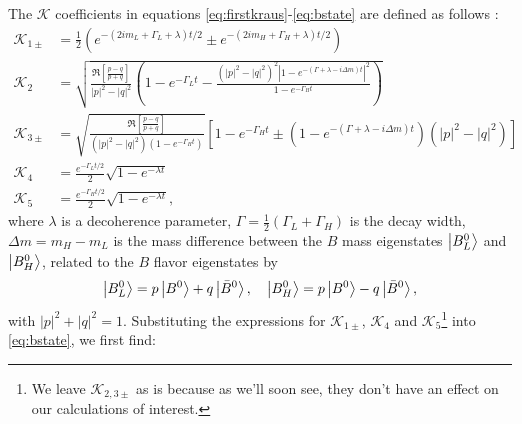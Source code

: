 The $\mathcal{K}$ coefficients in equations \ref{eq:firstkraus}-\ref{eq:bstate} are defined as follows \cite{Naikoo}:
\begin{align}
\mathcal{K}_{1\pm} &= \frac{1}{2}\left(e^{-(2im_L+\Gamma_L+\lambda)t/2}\pm e^{-(2im_H+\Gamma_H+\lambda)t/2}\right) \nonumber \\
\mathcal{K}_2 &= \sqrt{\frac{\Re\left[\frac{p-q}{p+q}\right]}{|p|^2-|q|^2}\left(1-e^{-\Gamma_L t}-\frac{(|p|^2-|q|^2)^2 |1-e^{-(\Gamma+\lambda-i\Delta m)t}|^2}{1-e^{-\Gamma_H t}}\right)} \nonumber \\
\mathcal{K}_{3\pm} &= \sqrt{\frac{\Re\left[\frac{p-q}{p+q}\right]}{(|p|^2-|q|^2)(1-e^{-\Gamma_H t})}}\left[1-e^{-\Gamma_H t}\pm(1-e^{-(\Gamma + \lambda-i\Delta m)t})(|p|^2-|q|^2)\right] \nonumber \\
\mathcal{K}_4 &= \frac{e^{-\Gamma_L t/2}}{2}\sqrt{1-e^{-\lambda t}} \nonumber \\
\mathcal{K}_5 &= \frac{e^{-\Gamma_H t/2}}{2}\sqrt{1-e^{-\lambda t}},
\end{align}
where $\lambda$ is a decoherence parameter, $\Gamma = \frac{1}{2}(\Gamma_L+\Gamma_H)$ is the decay width, $\Delta m = m_H-m_L$ is the mass difference between the $B$ mass eigenstates $\ket{B^0_L}$ and $\ket{B^0_H}$, related to the $B$ flavor eigenstates by
\begin{align}
\ket{B^0_L}=p\ket{B^0}+q\ket{\bar{B}^0}, \quad \ket{B_H^0}=p\ket{B^0}-q\ket{\bar{B}^0},
\end{align}
with $|p|^2 + |q|^2 = 1$. Substituting the expressions for $\mathcal{K}_{1\pm}$, $\mathcal{K}_4$ and $\mathcal{K}_5$\footnote{We leave $\mathcal{K}_{2,3\pm}$ as is because as we'll soon see, they don't have an effect on our calculations of interest.} into \ref{eq:bstate}, we first find:
